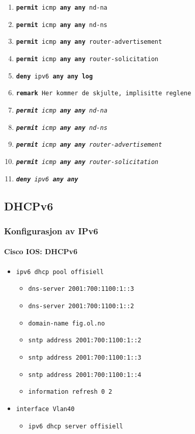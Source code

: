 \begin{frame}[allowframebreaks]
\begin{itemize}
\begin{enumerate}
    \item \texttt{\textbf{permit} icmp \textbf{any any} nd-na}
    \item \texttt{\textbf{permit} icmp \textbf{any any} nd-ns}
    \item \texttt{\textbf{permit} icmp \textbf{any any} router-advertisement}
    \item \texttt{\textbf{permit} icmp \textbf{any any} router-solicitation}
    \item \texttt{\textbf{deny\phantom{it}} ipv6 \textbf{any any \alert{log}}}
    \item \texttt{\textbf{remark} Her kommer de skjulte, implisitte reglene}
    \item \texttt{\textit{\textbf{permit} icmp \textbf{any} \textbf{any} nd-na}}
    \item \texttt{\textit{\textbf{permit} icmp \textbf{any} \textbf{any} nd-ns}}
    \item \texttt{\textit{\textbf{permit} icmp \textbf{any} \textbf{any} router-advertisement}}
    \item \texttt{\textit{\textbf{permit} icmp \textbf{any} \textbf{any} router-solicitation}}
    \item \texttt{\textit{\textbf{deny\phantom{it}} ipv6 \textbf{any} \textbf{any}}}
    \end{enumerate}
  \end{itemize}
\end{frame}

\subsection{DHCPv6}
\begin{frame}
  \frametitle{Konfigurasjon av IPv6}
  \framesubtitle{Cisco IOS: DHCPv6}
  \begin{itemize}
  \item \texttt{ipv6 dhcp pool offisiell}
    \begin{itemize}
    \item \texttt{dns-server 2001:700:1100:1::3}
    \item \texttt{dns-server 2001:700:1100:1::2}
    \item \texttt{domain-name fig.ol.no}
    \item \texttt{sntp address 2001:700:1100:1::2}
    \item \texttt{sntp address 2001:700:1100:1::3}
    \item \texttt{sntp address 2001:700:1100:1::4}
    \item \texttt{information refresh 0 2}
    \end{itemize}
  \item \texttt{interface Vlan40}
    \begin{itemize}
    \item \texttt{ipv6 dhcp server offisiell}
    \end{itemize}
  \end{itemize}
\end{frame}

